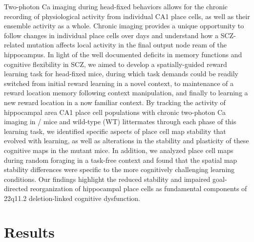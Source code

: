 Two-photon Ca imaging during head-fixed behaviors \citep{Danielson2016b, Dombeck2010} allows for the chronic recording of physiological activity from individual CA1 place cells, as well as their ensemble activity as a whole. Chronic imaging provides a unique opportunity to follow changes in individual place cells over days and understand how a SCZ-related mutation affects local activity in the final output node ream of the hippocampus. In light of the well documented deficits in memory functions and cognitive flexibility in SCZ, we aimed to develop a spatially-guided reward learning task for head-fixed mice, during which task demands could be readily switched from initial reward learning in a novel context, to maintenance of a reward location memory following context manipulation, and finally to learning a new reward location in a now familiar context. By tracking the activity of hippocampal area CA1 place cell populations with chronic two-photon Ca imaging in \df/ mice and wild-type (WT) littermates through each phase of this learning task, we identified specific aspects of place cell map stability that evolved with learning, as well as alterations in the stability and plasticity of these cognitive maps in the mutant mice. In addition, we analyzed place cell maps during random foraging in a task-free context and found that the spatial map stability differences were specific to the more cognitively challenging learning conditions. Our findings highlight the reduced stability and impaired goal-directed reorganization of hippocampal place cells as fundamental components of 22q11.2 deletion-linked cognitive dysfunction.  

\section{Results}

